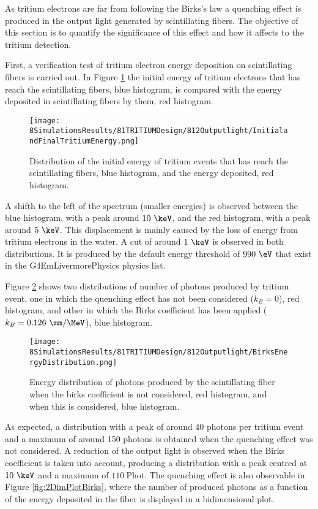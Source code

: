 As tritium electrons are far from following the Birks's law a quenching effect is produced in the output light generated by scintillating fibers. The objective of this section is to quantify the significance of this effect and how it affects to the tritium detection.

First, a verification test of tritium electron energy deposition on scintillating fibers is carried out. In Figure \ref{fig:InitialFinalTritiumEnergy} the initial energy of tritium electrons that has reach the scintillating fibers, blue histogram, is compared with the energy deposited in scintillating fibers by them, red histogram.

\begin{figure}[h]
\centering
\texttt{[image: 8SimulationsResults/81TRITIUMDesign/812Outputlight/InitialandFinalTritiumEnergy.png]}
\caption{Distribution of the initial energy of tritium events that has reach the scintillating fibers, blue histogram, and the energy deposited, red histogram.\label{fig:InitialFinalTritiumEnergy}}
\end{figure}

A shifth to the left of the spectrum (smaller energies) is observed between the blue histogram, with a peak around $10~\keV$, and the red histogram, with a peak around $5~\keV$. This displacement is mainly caused by the loss of energy from tritium electrons in the water. A cut of around $1~\keV$ is observed in both distributions. It is produced by the default energy threshold of $990~\eV$ that exist in the G4EmLivermorePhysics physics list.

Figure \ref{fig:BirksEffectinEnergyDistribution} shows two distributions of number of photons produced by tritium event, one in which the quenching effect has not been considered ($k_B=0$), red histogram, and other in which the Birks coefficient has been applied ($k_B=0.126~\mm/\MeV$), blue histogram.

\begin{figure}[h]
\centering
\texttt{[image: 8SimulationsResults/81TRITIUMDesign/812Outputlight/BirksEnergyDistribution.png]}
\caption{Energy distribution of photons produced by the scintillating fiber when the birks coefficient is not considered, red histogram, and when this is considered, blue histogram.\label{fig:BirksEffectinEnergyDistribution}}
\end{figure}  

As expected, a distribution with a peak of around 40 photons per tritium event and a maximum of around 150 photons is obtained when the quenching effect was not considered. A reduction of the output light is observed when the Birks coefficient is taken into account, producing a distribution with a peak centred at $10~\keV$ and a maximum of $110~\text{Phot}$. The quenching effect is also observable in Figure \ref{fig:2DimPlotBirks}, where the number of produced photons as a function of the energy deposited in the fiber is displayed in a bidimensional plot.

